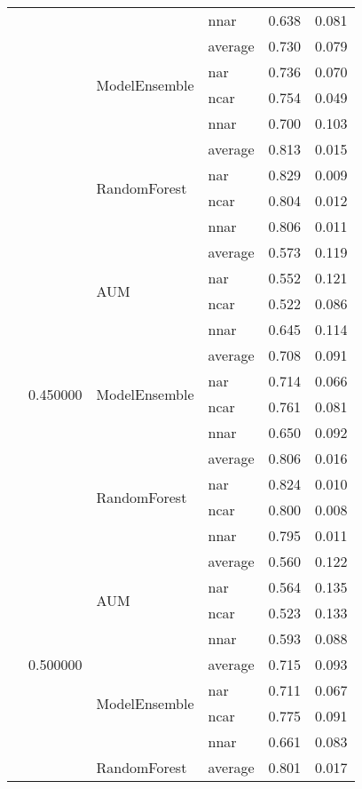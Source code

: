 \begin{longtable}{llllrr}
 &  &  & nnar & 0.638 & 0.081 \\
\cline{3-6}
 &  & \multirow[t]{4}{*}{ModelEnsemble} & average & 0.730 & 0.079 \\
 &  &  & nar & 0.736 & 0.070 \\
 &  &  & ncar & 0.754 & 0.049 \\
 &  &  & nnar & 0.700 & 0.103 \\
\cline{3-6}
 &  & \multirow[t]{4}{*}{RandomForest} & average & 0.813 & 0.015 \\
 &  &  & nar & 0.829 & 0.009 \\
 &  &  & ncar & 0.804 & 0.012 \\
 &  &  & nnar & 0.806 & 0.011 \\
\cline{2-6} \cline{3-6}
 & \multirow[t]{12}{*}{0.450000} & \multirow[t]{4}{*}{AUM} & average & 0.573 & 0.119 \\
 &  &  & nar & 0.552 & 0.121 \\
 &  &  & ncar & 0.522 & 0.086 \\
 &  &  & nnar & 0.645 & 0.114 \\
\cline{3-6}
 &  & \multirow[t]{4}{*}{ModelEnsemble} & average & 0.708 & 0.091 \\
 &  &  & nar & 0.714 & 0.066 \\
 &  &  & ncar & 0.761 & 0.081 \\
 &  &  & nnar & 0.650 & 0.092 \\
\cline{3-6}
 &  & \multirow[t]{4}{*}{RandomForest} & average & 0.806 & 0.016 \\
 &  &  & nar & 0.824 & 0.010 \\
 &  &  & ncar & 0.800 & 0.008 \\
 &  &  & nnar & 0.795 & 0.011 \\
\cline{2-6} \cline{3-6}
 & \multirow[t]{12}{*}{0.500000} & \multirow[t]{4}{*}{AUM} & average & 0.560 & 0.122 \\
 &  &  & nar & 0.564 & 0.135 \\
 &  &  & ncar & 0.523 & 0.133 \\
 &  &  & nnar & 0.593 & 0.088 \\
\cline{3-6}
 &  & \multirow[t]{4}{*}{ModelEnsemble} & average & 0.715 & 0.093 \\
 &  &  & nar & 0.711 & 0.067 \\
 &  &  & ncar & 0.775 & 0.091 \\
 &  &  & nnar & 0.661 & 0.083 \\
\cline{3-6}
 &  & \multirow[t]{4}{*}{RandomForest} & average & 0.801 & 0.017 \\

\end{longtable}
